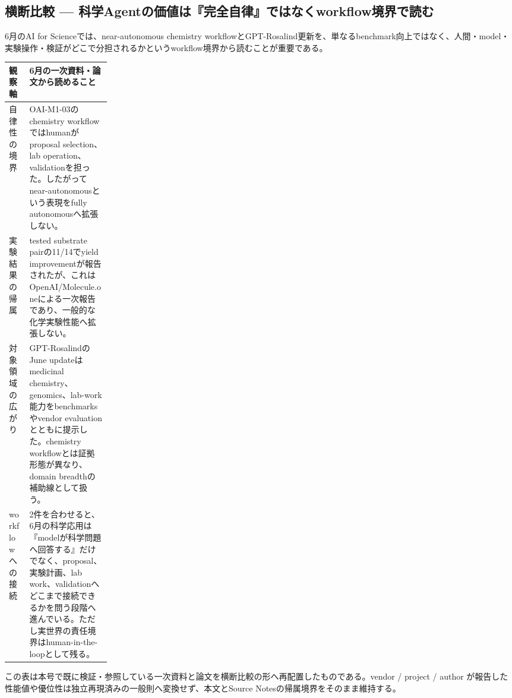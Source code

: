\subsection*{横断比較 — 科学Agentの価値は『完全自律』ではなくworkflow境界で読む}
6月のAI for Scienceでは、near-autonomous chemistry workflowとGPT-Rosalind更新を、単なるbenchmark向上ではなく、人間・model・実験操作・検証がどこで分担されるかというworkflow境界から読むことが重要である。
\medskip
\begin{center}
\small
\renewcommand{\arraystretch}{1.16}
\begin{tabularx}{\linewidth}{@{}p{0.20\linewidth}X@{}}
\toprule
観察軸 & 6月の一次資料・論文から読めること \\
\midrule
自律性の境界 & OAI-M1-03のchemistry workflowではhumanがproposal selection、lab operation、validationを担った。したがってnear-autonomousという表現をfully autonomousへ拡張しない。 \cite{src-5ff2f715f1e6} \\
実験結果の帰属 & tested substrate pairの11/14でyield improvementが報告されたが、これはOpenAI/Molecule.oneによる一次報告であり、一般的な化学実験性能へ拡張しない。 \cite{src-5ff2f715f1e6} \\
対象領域の広がり & GPT-RosalindのJune updateはmedicinal chemistry、genomics、lab-work能力をbenchmarksやvendor evaluationとともに提示した。chemistry workflowとは証拠形態が異なり、domain breadthの補助線として扱う。 \cite{src-ba562226725d} \\
workflowへの接続 & 2件を合わせると、6月の科学応用は『modelが科学問題へ回答する』だけでなく、proposal、実験計画、lab work、validationへどこまで接続できるかを問う段階へ進んでいる。ただし実世界の責任境界はhuman-in-the-loopとして残る。 \cite{src-5ff2f715f1e6,src-ba562226725d} \\
\bottomrule
\end{tabularx}
\renewcommand{\arraystretch}{1.0}
\end{center}
\normalsize
\begin{claimboundary}[この比較の境界]
この表は本号で既に検証・参照している一次資料と論文を横断比較の形へ再配置したものである。vendor / project / author が報告した性能値や優位性は独立再現済みの一般則へ変換せず、本文とSource Notesの帰属境界をそのまま維持する。
\end{claimboundary}
